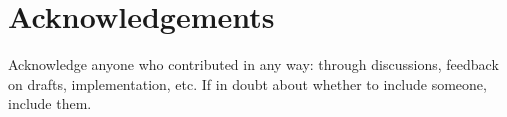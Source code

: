 \section{Acknowledgements}

Acknowledge anyone who contributed in any way: through discussions, feedback on drafts, implementation, etc. If in doubt about whether to include someone, include them.